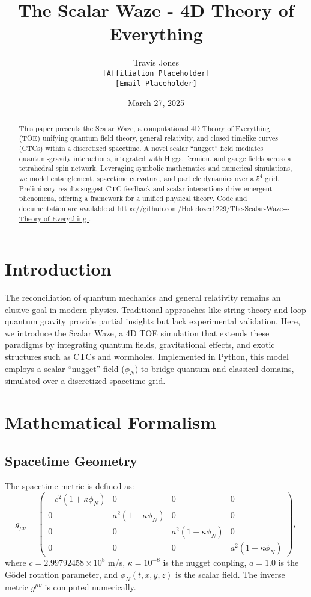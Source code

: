 \documentclass[11pt]{article}
\title{The Scalar Waze - 4D Theory of Everything}
\author{Travis Jones \\ \texttt{[Affiliation Placeholder]} \\ \texttt{[Email Placeholder]}}
\date{March 27, 2025}
\begin{document}
\maketitle

\begin{abstract}
This paper presents the Scalar Waze, a computational 4D Theory of Everything (TOE) unifying quantum field theory, general relativity, and closed timelike curves (CTCs) within a discretized spacetime. A novel scalar ``nugget'' field mediates quantum-gravity interactions, integrated with Higgs, fermion, and gauge fields across a tetrahedral spin network. Leveraging symbolic mathematics and numerical simulations, we model entanglement, spacetime curvature, and particle dynamics over a $5^4$ grid. Preliminary results suggest CTC feedback and scalar interactions drive emergent phenomena, offering a framework for a unified physical theory. Code and documentation are available at \url{https://github.com/Holedozer1229/The-Scalar-Waze---Theory-of-Everything-}.
\end{abstract}

\section{Introduction}
The reconciliation of quantum mechanics and general relativity remains an elusive goal in modern physics. Traditional approaches like string theory \citep{witten1995} and loop quantum gravity \citep{rovelli2004} provide partial insights but lack experimental validation. Here, we introduce the Scalar Waze, a 4D TOE simulation that extends these paradigms by integrating quantum fields, gravitational effects, and exotic structures such as CTCs and wormholes. Implemented in Python, this model employs a scalar ``nugget'' field ($\phi_N$) to bridge quantum and classical domains, simulated over a discretized spacetime grid.

\section{Mathematical Formalism}
\subsection{Spacetime Geometry}
The spacetime metric is defined as:
\begin{equation}
g_{\mu\nu} = \begin{pmatrix}
-c^2 (1 + \kappa \phi_N) & 0 & 0 & 0 \\
0 & a^2 (1 + \kappa \phi_N) & 0 & 0 \\
0 & 0 & a^2 (1 + \kappa \phi_N) & 0 \\
0 & 0 & 0 & a^2 (1 + \kappa \phi_N)
\end{pmatrix},
\label{eq:metric}
\end{equation}
where $c = 2.99792458 \times 10^8$ m/s, $\kappa = 10^{-8}$ is the nugget coupling, $a = 1.0$ is the Gödel rotation parameter, and $\phi_N(t, x, y, z)$ is the scalar field. The inverse metric $g^{\mu\nu}$ is computed numerically.
\end{document}
